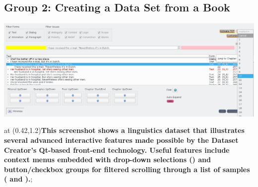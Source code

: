 \atspt
    \begin{frame}{}
\section{Group 2: Creating a Data Set from a Book}

        \begin{annotatedFigure}{0pt}{19pt}
            {\includegraphics[scale=.86]{texs/chapter.png}}
            
  \node [text width=22.5cm,inner sep=14pt,align=justify,fill=logoCyan!20, %
  draw = pink!20!black,
  top color=white,text=black,
  bottom color=pink!40,
  rounded corners=6pt%
  ]
   at (0.42,1.2){\annfont\textbf{This screenshot shows 
   a linguistics dataset that illustrates several \mbox{advanced} 
   interactive features made possible by the Dataset \mbox{Creator}'s 
   Qt-based front-end technology.  Useful features include context 
   menus \mbox{embedded} with drop-down selections () and 
   button/checkbox groups for filtered scrolling through 
   a list of samples ( and ).}};
    
         
            
  

  
        \end{annotatedFigure}


    \end{frame}

